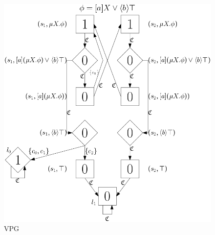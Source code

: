 \begin{figure}[h]
	\centering
	\includegraphics[scale=0.3]{Examples/ExamleVerification/VPG}
	\caption[VPG]{VPG}
	\label{fig:exvevpg}
\end{figure}

